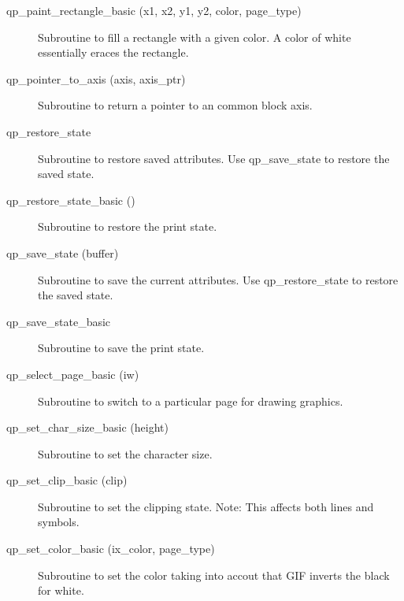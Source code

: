 \begin{description}
\label{r:qp.paint.rectangle.basic}
\item[qp_paint_rectangle_basic (x1, x2, y1, y2, color, page_type)] \Newline 
Subroutine to fill a rectangle with a given color. 
A color of white essentially eraces the rectangle.

\label{r:qp.pointer.to.axis}
\item[qp_pointer_to_axis (axis, axis_ptr)] \Newline 
Subroutine to return a pointer to an common block axis.

\label{r:qp.restore.state}
\item[qp_restore_state] \Newline 
     Subroutine to restore saved attributes. 
     Use qp_save_state to restore the saved state.

\label{r:qp.restore.state.basic}
\item[qp_restore_state_basic ()] \Newline 
Subroutine to restore the print state.

\label{r:qp.save.state}
\item[qp_save_state (buffer)] \Newline 
     Subroutine to save the current attributes. 
     Use qp_restore_state to restore the saved state.

\label{r:qp.save.state.basic}
\item[qp_save_state_basic ] \Newline 
Subroutine to save the print state.

\label{r:qp.select.page.basic}
\item[qp_select_page_basic (iw)] \Newline 
Subroutine to switch to a particular page for drawing graphics.

\label{r:qp.set.char.size.basic}
\item[qp_set_char_size_basic (height)] \Newline 
Subroutine to set the character size.

\label{r:qp.set.clip.basic}
\item[qp_set_clip_basic (clip)] \Newline 
Subroutine to set the clipping state.
Note: This affects both lines and symbols.

\label{r:qp.set.color.basic}
\item[qp_set_color_basic (ix_color, page_type)  ] \Newline 
Subroutine to set the color taking into accout that GIF
inverts the black for white.


\end{description}
